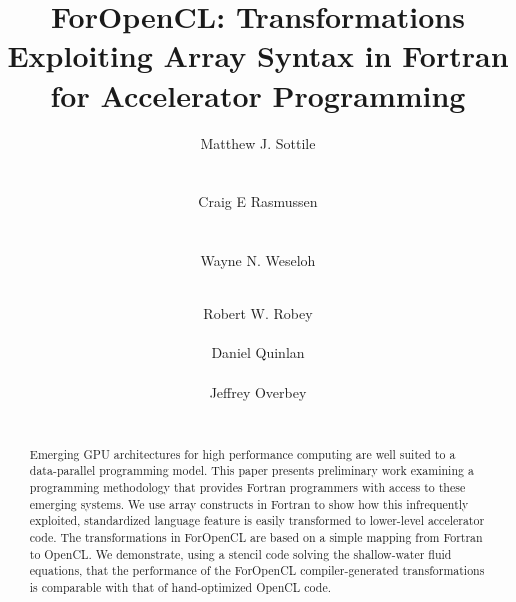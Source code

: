 \documentclass{acm_proc_article-sp}
\begin{document}
\title{ForOpenCL: Transformations Exploiting Array Syntax in Fortran for Accelerator Programming}


\author{
\alignauthor
Matthew J. Sottile\\
       \\
       \\
\alignauthor
Craig E Rasmussen\\
       \\
       \\
\alignauthor
Wayne N. Weseloh\\
       \\
\and  %
\alignauthor
Robert W. Robey\\
       \\
\alignauthor
Daniel Quinlan\\
       \\
\alignauthor
Jeffrey Overbey\\
       \\
}

\maketitle

\begin{abstract}
  Emerging GPU architectures for high performance computing are well suited to a
  data-parallel programming model.  This paper presents preliminary work
  examining a programming methodology that provides Fortran programmers with access
  to these emerging systems.  We use array constructs in Fortran to
  show how this infrequently exploited, standardized language feature is easily
  transformed to lower-level accelerator code.  The transformations in ForOpenCL are based
  on a simple mapping from Fortran to OpenCL.  We demonstrate, using a
  stencil code solving the shallow-water fluid equations, that the performance
  of the ForOpenCL compiler-generated transformations is comparable with that of
  hand-optimized OpenCL code.
\end{abstract}
\end{document}
